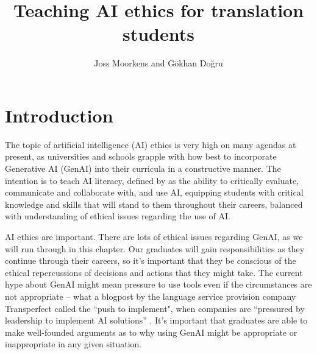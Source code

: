 \documentclass[output=paper]{langscibook}
\author{Joss Moorkens\orcid{}\affiliation{Dublin City University/ADAPT Centre, Ireland} and Gökhan Doğru\orcid{}\affiliation{Universitat Pompeu Fabra, Spain}}
\title{Teaching AI ethics for translation students}
\begin{document}
\maketitle 


\section{Introduction}\label{sec:6:1}
The topic of artificial intelligence (AI) ethics is very high on many agendas at present, as universities and schools grapple with how best to incorporate Generative AI (GenAI) into their curricula in a constructive manner. The intention is to teach AI literacy, defined by \citet[598]{longmagerko2020} as the ability to critically evaluate, communicate and collaborate with, and use AI, equipping students with critical knowledge and skills that will stand to them throughout their careers, balanced with understanding of ethical issues regarding the use of AI.

AI ethics are important. There are lots of ethical issues regarding GenAI, as we will run through in this chapter. Our graduates will gain responsibilities as they continue through their careers, so it’s important that they be conscious of the ethical repercussions of decisions and actions that they might take. The current hype about GenAI might mean pressure to use tools even if the circumstances are not appropriate – what a blogpost by the language service provision company Transperfect called the “push to implement", when companies are “pressured by leadership to implement AI solutions” \citep{transperfect_translation_2024}. It’s important that graduates are able to make well-founded arguments as to why using GenAI might be appropriate or inappropriate in any given situation.
\end{document}
